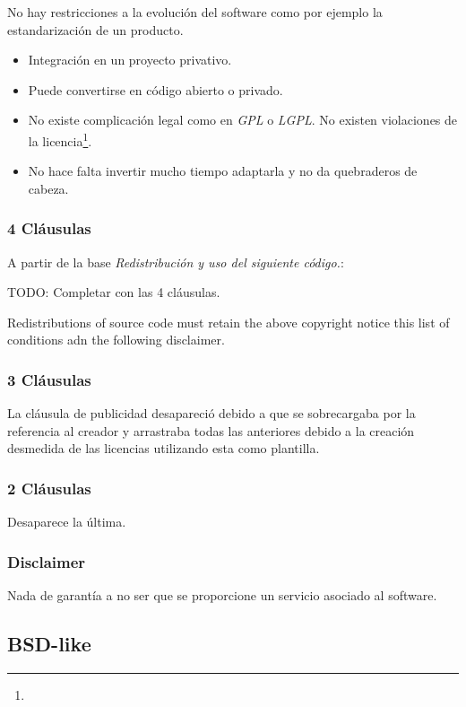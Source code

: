\documentclass[11pt]{scrartcl}
\begin{document}
No hay restricciones a la evoluci\'on del software como por ejemplo la estandarizaci\'on de un producto.

\begin{itemize}

	\item Integraci\'on en un proyecto privativo.
	\item Puede convertirse en c\'odigo abierto o privado.
	\item No existe complicaci\'on legal como en \emph{GPL} o \emph{LGPL}. No existen violaciones de la licencia\footnote{}.
	\item No hace falta invertir mucho tiempo adaptarla y no da quebraderos de cabeza.
\end{itemize}

\subsubsection{4 Cl\'ausulas}

A partir de la base \emph{Redistribuci\'on y uso del siguiente c\'odigo.}:

TODO: Completar con las 4 cl\'ausulas.

Redistributions of source code must retain the above copyright notice this list of conditions adn the following disclaimer.

\subsubsection{3 Cl\'ausulas}

La cl\'ausula de publicidad desapareci\'o debido a que se sobrecargaba por la referencia al creador y arrastraba todas las anteriores debido a la creaci\'on desmedida de las licencias utilizando esta como plantilla.

\subsubsection{2 Cl\'ausulas}

Desaparece la \'ultima.

\subsubsection{Disclaimer}

Nada de garant\'ia a no ser que se proporcione un servicio asociado al software.

\subsection{BSD-like}
\end{document}
